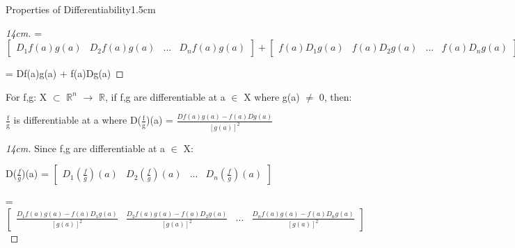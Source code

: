 \begin{ltheorem}{Properties of Differentiability}{1.5cm}
\begin{proof}[14cm]
                \hspace{0.2cm}
                = $
                \begin{bmatrix}
                    \scriptstyle D_1f(a)g(a)
                    & \scriptstyle D_2f(a)g(a)
                    & \scriptstyle ...
                    & \scriptstyle D_nf(a)g(a)
                \end{bmatrix} +
                \begin{bmatrix}
                    \scriptstyle f(a)D_1g(a)
                    & \scriptstyle f(a)D_2g(a)
                    & \scriptstyle ...
                    & \scriptstyle f(a)D_ng(a)
                \end{bmatrix}
                $

                \hspace{0.2cm}
                = Df(a)g(a) + f(a)Dg(a)
            \end{proof}

        \item For f,g: X $\subset$ $\mathbb{R}^n$ $\rightarrow$ $\mathbb{R}$,
            if f,g are differentiable at a $\in$ X where g(a) $\not =$ 0, then:

            \hspace{0.5cm}
            $\frac{\text{f}}{\text{g}}$ is differentiable at a
            where D($\frac{\text{f}}{\text{g}}$)(a)
            = $\frac{Df(a)g(a) - f(a)Dg(a)}{[g(a)]^2}$

            \begin{proof}[14cm]
                Since f,g are differentiable at a $\in$ X:

                \hspace{0.2cm}
                D($\frac{f}{g}$)(a) =
                $
                \begin{bmatrix}
                    D_1(\frac{f}{g})(a)
                    & D_2(\frac{f}{g})(a)
                    & ...
                    & D_n(\frac{f}{g})(a)
                \end{bmatrix}
                $

                \hspace{0.2cm}
                = $
                \begin{bmatrix}
                    \scriptstyle \frac{D_1f(a)g(a)-f(a)D_1g(a)}{[g(a)]^2}
                    & \scriptstyle \frac{D_2f(a)g(a)-f(a)D_2g(a)}{[g(a)]^2}
                    & \scriptstyle ...
                    & \scriptstyle \frac{D_nf(a)g(a)-f(a)D_ng(a)}{[g(a)]^2}
                \end{bmatrix}
                $


\end{proof}
\end{ltheorem}
